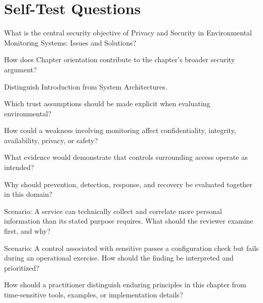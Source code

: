 \documentclass[11pt,letterpaper]{article}
\begin{document}
\section*{Self-Test Questions}
\begin{CornellRecallList}
\item What is the central security objective of Privacy and Security in Environmental Monitoring Systems: Issues and Solutions?
\item How does Chapter orientation contribute to the chapter's broader security argument?
\item Distinguish Introduction from System Architectures.
\item Which trust assumptions should be made explicit when evaluating environmental?
\item How could a weakness involving monitoring affect confidentiality, integrity, availability, privacy, or safety?
\item What evidence would demonstrate that controls surrounding access operate as intended?
\item Why should prevention, detection, response, and recovery be evaluated together in this domain?
\item Scenario: A service can technically collect and correlate more personal information than its stated purpose requires. What should the reviewer examine first, and why?
\item Scenario: A control associated with sensitive passes a configuration check but fails during an operational exercise. How should the finding be interpreted and prioritized?
\item How should a practitioner distinguish enduring principles in this chapter from time-sensitive tools, examples, or implementation details?
\end{CornellRecallList}
\end{document}
